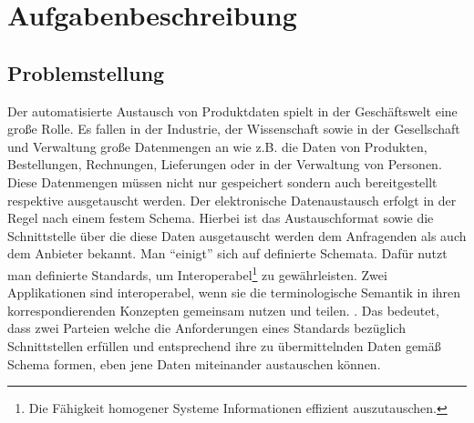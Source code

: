 \chapter{Aufgabenbeschreibung} \label{kap:aufgabenbeschreibung}

\section{Problemstellung}\label{sec:problemstellung}


Der automatisierte Austausch von Produktdaten spielt in der Geschäftswelt eine große Rolle. Es fallen in der Industrie, der Wissenschaft sowie in der Gesellschaft und Verwaltung große Datenmengen an wie z.B. die Daten von Produkten, Bestellungen, Rechnungen, Lieferungen oder in der Verwaltung von Personen. Diese Datenmengen müssen nicht nur gespeichert sondern auch bereitgestellt respektive ausgetauscht werden. Der elektronische Datenaustausch erfolgt in der Regel nach einem festem Schema. Hierbei ist das Austauschformat sowie die Schnittstelle über die diese Daten ausgetauscht werden dem Anfragenden als auch dem Anbieter bekannt. Man \enquote{einigt} sich auf definierte Schemata. Dafür nutzt man definierte Standards, um \gls{Interoperabel}\footnote{Die Fähigkeit homogener Systeme Informationen effizient auszutauschen.} zu gewährleisten. Zwei Applikationen sind interoperabel, wenn sie die terminologische Semantik in ihren korrespondierenden Konzepten gemeinsam nutzen und teilen. \citep[vgl.][S. 23f]{Hemmje}. 
Das bedeutet, dass zwei Parteien welche die Anforderungen eines Standards bezüglich Schnittstellen erfüllen und entsprechend ihre zu übermittelnden Daten gemäß Schema formen, eben jene Daten miteinander austauschen können. 

